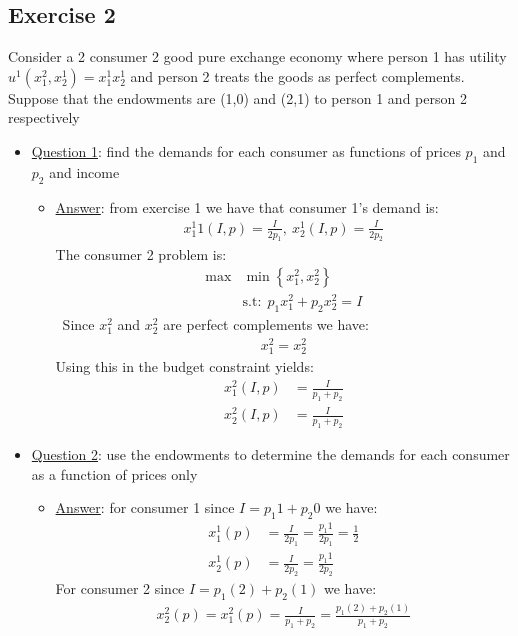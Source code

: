 \documentclass{article}
\begin{document}
\subsection{Exercise 2}
Consider a 2 consumer 2  good pure exchange economy where person 1 has utility $u^{1}(x_{1}^{2},x_{2}^{1}) = x_{1}^{1}x_{2}^{1}$ and person 2 treats the goods as perfect complements. Suppose that the endowments are (1,0) and (2,1) to person 1 and person 2 respectively
  \par \vspace{0.3em}
  \begin{itemize}
    \item  \underline{Question 1}: find the demands for each consumer as functions of prices $p_{1}$  and $p_{2}$ and income
    \begin{itemize}
      \item  \underline{Answer}: from exercise 1 we have that consumer 1's demand is:
      \begin{gather*}
        x_{1}^1{1}(I,p) = \frac{I}{2p_{1}}, \ x_{2}^{1}(I,p) = \frac{I}{2p_{2}}
      \end{gather*}
      The consumer 2 problem is:
      \begin{align*}
        \max & \min \left\{ x_{1}^{2}, x_{2}^{2} \right\} \\
        &\text{s.t:} \ \ p_{1}x_{1}^{2} + p_{2}x_{2}^{2} = I
      \end{align*}\
      Since $x_{1}^{2}$ and $x_{2}^{2}$ are perfect complements we have:
      \begin{gather*}
        x_{1}^{2} = x_{2}^{2}
      \end{gather*}
      Using this in the budget constraint yields:
      \begin{align*}
        x_{1}^{2}(I,p) &= \frac{I}{p_{1} + p_{2}} \\
        x_{2}^{2}(I,p) &= \frac{I}{p_{1} + p_{2}}
      \end{align*}
    \end{itemize}
  \end{itemize}
  \begin{itemize}
    \item  \underline{Question 2}: use the endowments to determine the demands for each consumer as a function of prices only
    \begin{itemize}
      \item  \underline{Answer}: for consumer 1 since $I = p_{1}1 + p_{2}0$ we have:
      \begin{align*}
        x_{1}^{1}(p) &= \frac{I}{2p_{1}} = \frac{p_{1}1}{2p_{1}} = \frac{1}{2} \\
        x_{2}^{1}(p) &= \frac{I}{2p_{2}} = \frac{p_{1}1}{2p_{2}}
      \end{align*}
      For consumer 2 since $I = p_{1}(2) + p_{2}(1)$ we have:
      \begin{gather*}
        x_{2}^{2}(p) = x_{1}^{2}(p) = \frac{I}{p_{1} + p_{2}} = \frac{p_{1}(2) + p_{2}(1)}{p_{1} + p_{2}}
      \end{gather*}
    \end{itemize}
  \end{itemize}
\end{document}
